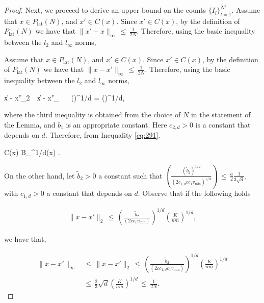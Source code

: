 \documentclass[twoside,11pt]{article}
\begin{document}
\begin{proof}
Next, we proceed to derive an upper bound on the counts \(\{I_{l}\}_{l=1}^{N^d}\). Assume that \(x \in P_{\text{lat}}(N)\), and \(x' \in C(x)\). Since \(x' \in C(x)\), by the definition of \(P_{\text{lat}}(N)\) we have that \(\|x' - x\|_\infty \,\leq\, \frac{1}{2N}\). Therefore, using the basic inequality between the \(l_2\) and \(l_\infty\) norms,


Assume that \(x \in P_{\text{lat}}(N)\), and \(x' \in C(x)\). Since \(x' \in C(x)\), by the definition of \(P_{\text{lat}}(N)\) we have that \(\|x - x'\|_{\infty} \,\leq\, \frac{1}{2N}\). Therefore, using the basic inequality between the \(l_2\) and \(l_{\infty}\) norms,

\beq 
\label{eq:291}
\|x - x'\|_2 \,\leq\,  \|x - x'\|_{\infty} \,\leq\,  \,\leq\,   \left(\right)^{1/d}  = \left(\right)^{1/d},
\beq 

where the third inequality is obtained from the choice of \(N\) in the statement of the Lemma, and \(b_1\) is an appropriate constant. Here \(c_{2,d} > 0\) is a constant that depends on \(d\). Therefore, from Inequality \eqref{eq:291}.


\beq 
\label{eq:292}
C(x) \subseteq B_{^{1/d}}(x) .
\beq   



On the other hand, let $\tilde{b}_2 > 0$ a constant such that $\left( \frac{(\tilde{b}_2)^{1/d}}{(2c_{1,d}c c_1 v_{\text{min}})^{1/d}} \right) \,\leq\, \frac{a}{2}\frac{1}{3\sqrt{d}} $, with $c_{1,d} > 0$ a constant that depends on $d$. Observe that if the following holds

\begin{align}
   \|x - x'\|_2 \,\leq\,  \left( \frac{\tilde{b}_2}{(2cc_1v_{\text{min}})} \right)^{1/d} \left( \frac{K}{nm} \right)^{1/d}, 
\end{align}

we have that,

\begin{align}
    \|x - x'\|_{\infty} &\,\leq\, \|x - x'\|_2 \,\leq\, \left( \frac{\tilde{b}_2}{(2cc_{1,d}c_1v_{\text{min}})} \right)^{1/d} \left( \frac{K}{nm} \right)^{1/d} \nonumber \\
    &\,\leq\, \frac{2}{3} \sqrt{d} \left( \frac{K}{nm} \right)^{1/d} \,\leq\, \frac{1}{2N}. \label{eq:295}
\end{align}


\end{proof}
\end{document}
